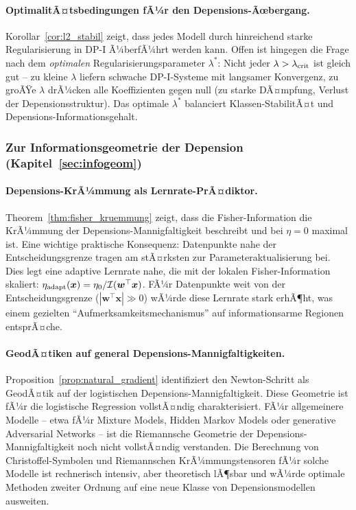 ﻿\documentclass[12pt, a4paper]{article}
\theoremstyle{definition}
\theoremstyle{remark}
\newcommand{\vw}{\bm{w}}
\newcommand{\vx}{\bm{x}}
\newcommand{\T}{\top}
\begin{document}
\paragraph{OptimalitÃ¤tsbedingungen fÃ¼r den Depensions-Ãœbergang.}
Korollar~\ref{cor:l2_stabil} zeigt, dass jedes Modell durch hinreichend starke
Regularisierung in DP-I Ã¼berfÃ¼hrt werden kann. Offen ist hingegen die Frage nach
dem \emph{optimalen} Regularisierungsparameter $\lambda^*$: Nicht jeder $\lambda >
\lambda_{\rm crit}$ ist gleich gut -- zu kleine $\lambda$ liefern schwache DP-I-Systeme
mit langsamer Konvergenz, zu groÃŸe $\lambda$ drÃ¼cken alle Koeffizienten gegen null
(zu starke DÃ¤mpfung, Verlust der Depensionsstruktur). Das optimale $\lambda^*$
balanciert Klassen-StabilitÃ¤t und Depensions-Informationsgehalt.

\subsubsection{Zur Informationsgeometrie der Depension (Kapitel~\ref{sec:infogeom})}

\paragraph{Depensions-KrÃ¼mmung als Lernrate-PrÃ¤diktor.}
Theorem~\ref{thm:fisher_kruemmung} zeigt, dass die Fisher-Information die KrÃ¼mmung
der Depensions-Mannigfaltigkeit beschreibt und bei $\eta=0$ maximal ist.
Eine wichtige praktische Konsequenz: Datenpunkte nahe der Entscheidungsgrenze tragen
am stÃ¤rksten zur Parameteraktualisierung bei. Dies legt eine adaptive Lernrate nahe,
die mit der lokalen Fisher-Information skaliert:
$\eta_{\rm adapt}(\vx) = \eta_0 / \mathcal{I}(\vw^\T\vx)$. FÃ¼r Datenpunkte weit
von der Entscheidungsgrenze ($|\vw^\T\vx| \gg 0$) wÃ¼rde diese Lernrate stark erhÃ¶ht,
was einem gezielten ``Aufmerksamkeitsmechanismus'' auf informationsarme Regionen
entsprÃ¤che.

\paragraph{GeodÃ¤tiken auf general Depensions-Mannigfaltigkeiten.}
Proposition~\ref{prop:natural_gradient} identifiziert den Newton-Schritt als
GeodÃ¤tik auf der logistischen Depensions-Mannigfaltigkeit. Diese Geometrie ist fÃ¼r
die logistische Regression vollstÃ¤ndig charakterisiert. FÃ¼r allgemeinere Modelle --
etwa fÃ¼r Mixture Models, Hidden Markov Models oder generative Adversarial Networks --
ist die Riemannsche Geometrie der Depensions-Mannigfaltigkeit noch nicht vollstÃ¤ndig
verstanden. Die Berechnung von Christoffel-Symbolen und Riemannschen KrÃ¼mmungstensoren
fÃ¼r solche Modelle ist rechnerisch intensiv, aber theoretisch lÃ¶sbar und wÃ¼rde
optimale Methoden zweiter Ordnung auf eine neue Klasse von Depensionsmodellen ausweiten.
\end{document}
